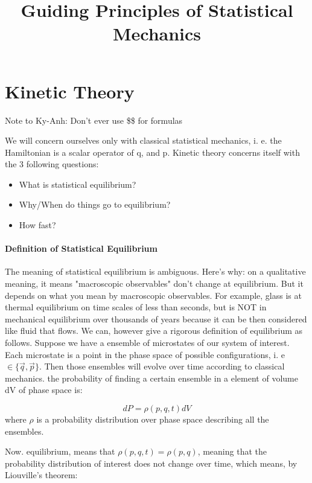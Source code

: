 
\title{Guiding Principles of Statistical Mechanics}

\maketitle

\section{Kinetic Theory}

Note to Ky-Anh: Don't ever use \$\$ for formulas

We will concern ourselves only with classical statistical mechanics, i. e. the Hamiltonian is a scalar operator of q, and p.  Kinetic theory concerns itself with the 3 following questions:


\begin{itemize}
\item What is statistical equilibrium?
\item Why/When do things go to equilibrium?
\item How fast?
\end{itemize}

\paragraph{Definition of Statistical Equilibrium}

The meaning of statistical equilibrium is ambiguous.  Here's why:  on a qualitative meaning, it means "macroscopic observables" don't change at equilibrium.  But it depends on what you mean by macroscopic observables.  For example, glass is at thermal equilibrium on time scales of less than seconds, but is NOT in mechanical equilibrium over thousands of years because it can be then considered like fluid that flows.  We can, however give a rigorous definition of equilibrium as follows.  Suppose we have a ensemble of microstates of our system of interest.  Each microstate is a point in the phase space of possible configurations, i. e $\in \{ \vec{q}, \vec{p} \}$.  Then those ensembles will evolve over time according to classical mechanics.  the probability of finding a certain ensemble in a element of volume dV of phase space is:

$$ dP = \rho(p, q,t)dV$$
where $\rho$ is a probability distribution over phase space describing all the ensembles.

Now. equilibrium, means that $\rho(p,q,t)= \rho(p,q)$, meaning that the probability distribution of interest does not change over time, which means, by Liouville's theorem:

